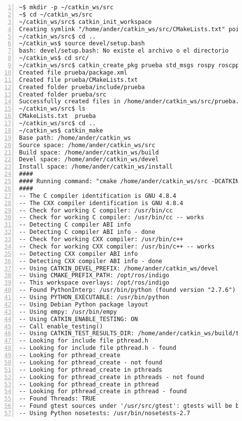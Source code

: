 	\begin{lstlisting}[style=consola,numbers=left]
~$ mkdir -p ~/catkin_ws/src
~$ cd ~/catkin_ws/src
~/catkin_ws/src$ catkin_init_workspace
Creating symlink "/home/ander/catkin_ws/src/CMakeLists.txt" pointing to "/opt/ros/indigo/share/catkin/cmake/toplevel.cmake"
~/catkin_ws/src$ cd ..
~/catkin_ws$ source devel/setup.bash
bash: devel/setup.bash: No existe el archivo o el directorio
~/catkin_ws$ cd src/
~/catkin_ws/src$ catkin_create_pkg prueba std_msgs rospy roscpp
Created file prueba/package.xml
Created file prueba/CMakeLists.txt
Created folder prueba/include/prueba
Created folder prueba/src
Successfully created files in /home/ander/catkin_ws/src/prueba. Please adjust the values in package.xml.
~/catkin_ws/src$ ls
CMakeLists.txt  prueba
~/catkin_ws/src$ cd ..
~/catkin_ws$ catkin_make
Base path: /home/ander/catkin_ws
Source space: /home/ander/catkin_ws/src
Build space: /home/ander/catkin_ws/build
Devel space: /home/ander/catkin_ws/devel
Install space: /home/ander/catkin_ws/install
####
#### Running command: "cmake /home/ander/catkin_ws/src -DCATKIN_DEVEL_PREFIX=/home/ander/catkin_ws/devel -DCMAKE_INSTALL_PREFIX=/home/ander/catkin_ws/install -G Unix Makefiles" in "/home/ander/catkin_ws/build"
####
-- The C compiler identification is GNU 4.8.4
-- The CXX compiler identification is GNU 4.8.4
-- Check for working C compiler: /usr/bin/cc
-- Check for working C compiler: /usr/bin/cc -- works
-- Detecting C compiler ABI info
-- Detecting C compiler ABI info - done
-- Check for working CXX compiler: /usr/bin/c++
-- Check for working CXX compiler: /usr/bin/c++ -- works
-- Detecting CXX compiler ABI info
-- Detecting CXX compiler ABI info - done
-- Using CATKIN_DEVEL_PREFIX: /home/ander/catkin_ws/devel
-- Using CMAKE_PREFIX_PATH: /opt/ros/indigo
-- This workspace overlays: /opt/ros/indigo
-- Found PythonInterp: /usr/bin/python (found version "2.7.6")
-- Using PYTHON_EXECUTABLE: /usr/bin/python
-- Using Debian Python package layout
-- Using empy: /usr/bin/empy
-- Using CATKIN_ENABLE_TESTING: ON
-- Call enable_testing()
-- Using CATKIN_TEST_RESULTS_DIR: /home/ander/catkin_ws/build/test_results
-- Looking for include file pthread.h
-- Looking for include file pthread.h - found
-- Looking for pthread_create
-- Looking for pthread_create - not found
-- Looking for pthread_create in pthreads
-- Looking for pthread_create in pthreads - not found
-- Looking for pthread_create in pthread
-- Looking for pthread_create in pthread - found
-- Found Threads: TRUE  
-- Found gtest sources under '/usr/src/gtest': gtests will be built
-- Using Python nosetests: /usr/bin/nosetests-2.7

\end{lstlisting}
